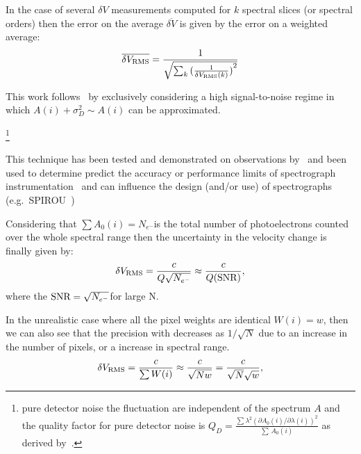 In the case of several \(\delta V\) measurements computed for \(k\) spectral slices (or spectral orders) then the error on the average \(\overline{\delta V}\) is given by the error on a weighted average:
\begin{equation}
\overline{\delta {V}_{\textrm{RMS}}} = \frac{1}{\sqrt{\sum_k{{(\frac{1}{\delta V_{\textrm{RMS}}(k)})}^{2}}}}  \label{eqn:weighted_average_error}
\end{equation}

This work follows~\cite{figueira_radial_2016} by exclusively considering a high signal-to-noise regime in which \({A(i) + \sigma_{D}^{2}} \sim {A(i)}\) can be approximated.


\footnote{pure detector noise the fluctuation are independent of the spectrum \(A\) and the quality factor for pure detector noise is \(Q_D = \frac{\sum{{\lambda}^{2} {(\partial A_0(i)/\partial \lambda(i))}^{2}}}{\sum{\, A_0(i)}}\) as derived by~\cite{connes_absolute_1985}. }


This technique has been tested and demonstrated on observations by~\citet{connes_demonstration_1996} and been used to determine predict the accuracy or performance limits of spectrograph instrumentation~\citep[e.g.][]{connes_absolute_1985,bouchy_fundamental_2001} and can influence the design (and/or use) of spectrographs
 (e.g.\ SPIROU~\citep{artigau_spirou_2014,figueira_radial_2016})


Considering that \(\sum{A_0(i)} = N_{{e}^{-}}\)is the total number of photoelectrons counted over the whole spectral range then the uncertainty in the velocity change is finally given by:
\begin{equation}
\delta V_{\textrm{RMS}} = \frac{c}{Q \sqrt{N_{{e}^{-}}}} \approx \frac{c}{Q (\textrm{SNR}{})}, \label{eqn:rv_SNR}
\end{equation}
where the \(\textrm{SNR}{}=\sqrt{N_{{e}^{-}}}\)for large N. 


In the unrealistic case where all the pixel weights are identical $W(i)=w$, then we can also see that the precision with decreases as $1/\sqrt{N}$ due to an increase in the number of pixels, or a increase in spectral range.
 \begin{equation}
 \delta V_{\textrm{RMS}} = \frac{c}{\sum{W(i)}} \approx \frac{c}{\sqrt{N w}}=  \frac{c}{\sqrt{N}\sqrt{w}}, \label{eqn:sqrtN}
 \end{equation}

